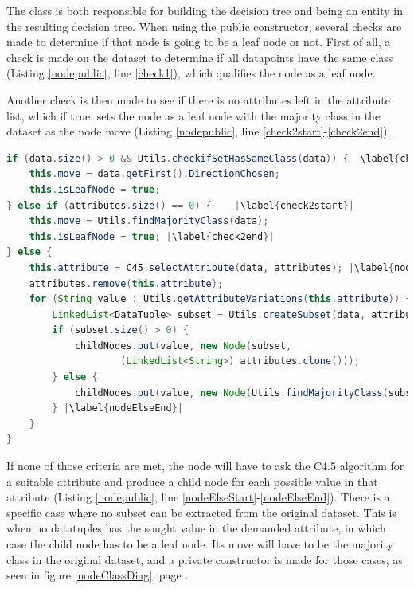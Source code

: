 \documentclass{article}
\begin{document}
    The  class is both responsible for building the decision tree and being an entity in the resulting decision tree. When using the public constructor, several checks are made to determine if that node is going to be a leaf node or not. First of all, a check is made on the dataset to determine if all datapoints have the same class (Listing \ref{nodepublic}, line \ref{check1}), which qualifies the node as a leaf node.

    Another check is then made to see if there is no attributes left in the attribute list, which if true, sets the node as a leaf node with the majority class in the dataset as the node move (Listing \ref{nodepublic}, line \ref{check2start}-\ref{check2end}).

    \begin{lstlisting}[language=Java, caption=Excerpt from \protect\UseVerb{node} public constructor, label={nodepublic}, escapechar=|]
if (data.size() > 0 && Utils.checkifSetHasSameClass(data)) { |\label{check1}|
    this.move = data.getFirst().DirectionChosen;
    this.isLeafNode = true;
} else if (attributes.size() == 0) {    |\label{check2start}|
    this.move = Utils.findMajorityClass(data);
    this.isLeafNode = true; |\label{check2end}|
} else {
    this.attribute = C45.selectAttribute(data, attributes); |\label{nodeElseStart}|
    attributes.remove(this.attribute);
    for (String value : Utils.getAttributeVariations(this.attribute)) {
        LinkedList<DataTuple> subset = Utils.createSubset(data, attribute, value);
        if (subset.size() > 0) {
            childNodes.put(value, new Node(subset,
                    (LinkedList<String>) attributes.clone()));
        } else {
            childNodes.put(value, new Node(Utils.findMajorityClass(subset)));
        } |\label{nodeElseEnd}|
    }
}
\end{lstlisting}

    If none of those criteria are met, the node will have to ask the C4.5 algorithm for a suitable attribute and produce a child node for each possible value in that attribute (Listing \ref{nodepublic}, line \ref{nodeElseStart}-\ref{nodeElseEnd}). There is a specific case where no subset can be extracted from the original dataset. This is when no datatuples has the sought value in the demanded attribute, in which case the child node has to be a leaf node. Its move will have to be the majority class in the original dataset, and a private constructor is made for those cases, as seen in figure \ref{nodeClassDiag}, page \pageref{nodeClassDiag}.
\end{document}
